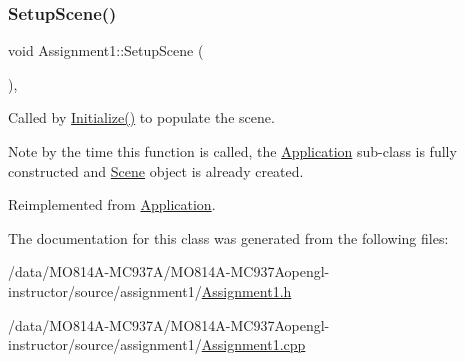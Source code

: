 \hypertarget{class_assignment1_a8d12cf21f1463caa5a8da45110b50103}{}\label{class_assignment1_a8d12cf21f1463caa5a8da45110b50103}
\subsubsection{\texorpdfstring{Setup\+Scene()}{SetupScene()}}
{\footnotesize\ttfamily void Assignment1\+::\+Setup\+Scene (\begin{DoxyParamCaption}{ }\end{DoxyParamCaption})\hspace{0.3cm}{\ttfamily [private]}, {\ttfamily [virtual]}}



Called by \hyperlink{class_application_a17cf1ea4552d26a1c20f7d98d793d41d}{Initialize()} to populate the scene.

Note by the time this function is called, the \hyperlink{class_application}{Application} sub-\/class is fully constructed and \hyperlink{class_scene}{Scene} object is already created.

Reimplemented from \hyperlink{class_application_aa8e8017ef8dd86293c96d0645e66d440}{Application}.



The documentation for this class was generated from the following files\+:\begin{DoxyCompactItemize}
\item
/data/MO814A-MC937A/MO814A-MC937Aopengl-\/instructor/source/assignment1/\hyperlink{_assignment1_8h}{Assignment1.\+h}\item
/data/MO814A-MC937A/MO814A-MC937Aopengl-\/instructor/source/assignment1/\hyperlink{_assignment1_8cpp}{Assignment1.\+cpp}\end{DoxyCompactItemize}
